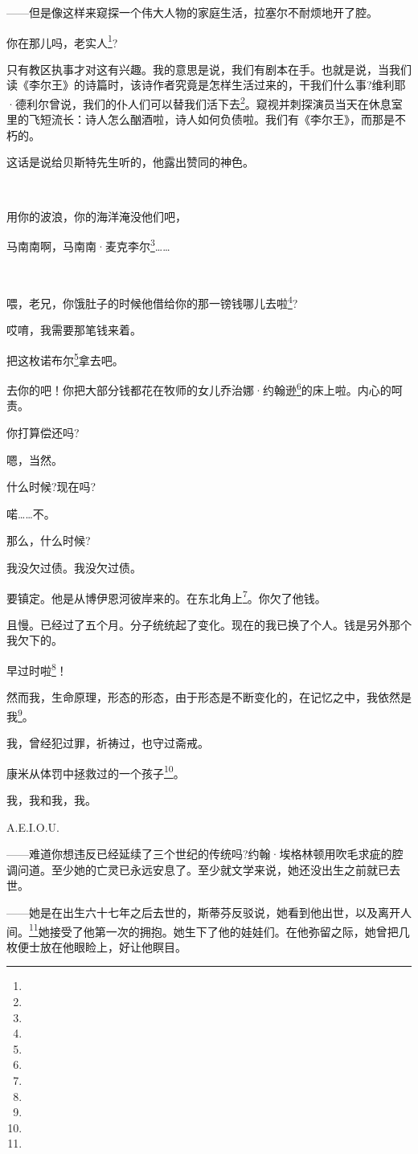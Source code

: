 \par ——但是像这样来窥探一个伟大人物的家庭生活，拉塞尔不耐烦地开了腔。
\par 你在那儿吗，老实人\footnote{}?
\par 只有教区执事才对这有兴趣。我的意思是说，我们有剧本在手。也就是说，当我们读《李尔王》的诗篇时，该诗作者究竟是怎样生活过来的，干我们什么事?维利耶·德利尔曾说，我们的仆人们可以替我们活下去\footnote{}。窥视并刺探演员当天在休息室里的飞短流长：诗人怎么酗酒啦，诗人如何负债啦。我们有《李尔王》，而那是不朽的。
\par 这话是说给贝斯特先生听的，他露出赞同的神色。
\par  
\par 用你的波浪，你的海洋淹没他们吧，
\par 马南南啊，马南南·麦克李尔\footnote{}……
\par  
\par 喂，老兄，你饿肚子的时候他借给你的那一镑钱哪儿去啦\footnote{}?
\par 哎唷，我需要那笔钱来着。
\par 把这枚诺布尔\footnote{}拿去吧。
\par 去你的吧！你把大部分钱都花在牧师的女儿乔治娜·约翰逊\footnote{}的床上啦。内心的呵责。
\par 你打算偿还吗?
\par 嗯，当然。
\par 什么时候?现在吗?
\par 喏……不。
\par 那么，什么时候?
\par 我没欠过债。我没欠过债。
\par 要镇定。他是从博伊恩河彼岸来的。在东北角上\footnote{}。你欠了他钱。
\par 且慢。已经过了五个月。分子统统起了变化。现在的我已换了个人。钱是另外那个我欠下的。
\par 早过时啦\footnote{}！
\par 然而我，生命原理，形态的形态，由于形态是不断变化的，在记忆之中，我依然是我\footnote{}。
\par 我，曾经犯过罪，祈祷过，也守过斋戒。
\par 康米从体罚中拯救过的一个孩子\footnote{}。
\par 我，我和我，我。
\par A.E.I.O.U.
\par ——难道你想违反已经延续了三个世纪的传统吗?约翰·埃格林顿用吹毛求疵的腔调问道。至少她的亡灵已永远安息了。至少就文学来说，她还没出生之前就已去世。
\par ——她是在出生六十七年之后去世的，斯蒂芬反驳说，她看到他出世，以及离开人间。\footnote{}她接受了他第一次的拥抱。她生下了他的娃娃们。在他弥留之际，她曾把几枚便士放在他眼睑上，好让他瞑目。
